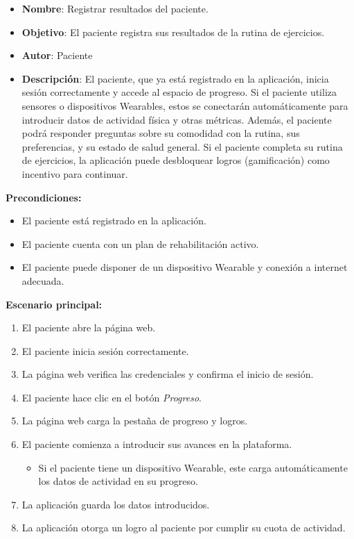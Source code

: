 \documentclass{article}
\begin{document}
\begin{itemize}
	\item \textbf{Nombre}: Registrar resultados del paciente.
	\item \textbf{Objetivo}: El paciente registra sus resultados de la rutina de ejercicios.
	\item \textbf{Autor}: Paciente
	\item \textbf{Descripción}: 
	El paciente, que ya está registrado en la aplicación, inicia sesión correctamente y accede al espacio de progreso. Si el paciente utiliza sensores o dispositivos Wearables, estos se conectarán automáticamente para introducir datos de actividad física y otras métricas. Además, el paciente podrá responder preguntas sobre su comodidad con la rutina, sus preferencias, y su estado de salud general. Si el paciente completa su rutina de ejercicios, la aplicación puede desbloquear logros (gamificación) como incentivo para continuar.
\end{itemize}

\textbf{Precondiciones:}
\begin{itemize}
	\item El paciente está registrado en la aplicación.
	\item El paciente cuenta con un plan de rehabilitación activo.
	\item El paciente puede disponer de un dispositivo Wearable y conexión a internet adecuada.
\end{itemize}

\textbf{Escenario principal:}
\begin{enumerate}
	\item El paciente abre la página web.
	\item El paciente inicia sesión correctamente.
	\item La página web verifica las credenciales y confirma el inicio de sesión.
	\item El paciente hace clic en el botón \textit{Progreso}.
	\item La página web carga la pestaña de progreso y logros.
	\item El paciente comienza a introducir sus avances en la plataforma.
	\begin{itemize}
		\item Si el paciente tiene un dispositivo Wearable, este carga automáticamente los datos de actividad en su progreso.
	\end{itemize}
	\item La aplicación guarda los datos introducidos.
	\item La aplicación otorga un logro al paciente por cumplir su cuota de actividad.
\end{enumerate}
\end{document}

